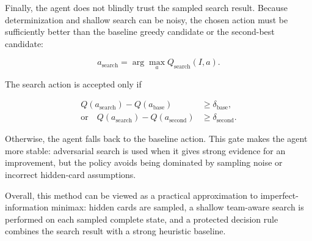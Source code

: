 Finally, the agent does not blindly trust the sampled search result. Because
determinization and shallow search can be noisy, the chosen action must be
sufficiently better than the baseline greedy candidate or the second-best
candidate:

\[
    a_{\mathrm{search}} = \arg\max_a Q_{\mathrm{search}}(I,a).
\]

The search action is accepted only if

\begin{align*}
    Q(a_{\mathrm{search}}) - Q(a_{\mathrm{base}})
     & \ge \delta_{\mathrm{base}},   \\
    \text{or}\quad
    Q(a_{\mathrm{search}}) - Q(a_{\mathrm{second}})
     & \ge \delta_{\mathrm{second}}.
\end{align*}

Otherwise, the agent falls back to the baseline action. This gate makes the
agent more stable: adversarial search is used when it gives strong evidence for
an improvement, but the policy avoids being dominated by sampling noise or
incorrect hidden-card assumptions.

Overall, this method can be viewed as a practical approximation to
imperfect-information minimax: hidden cards are sampled, a shallow team-aware
search is performed on each sampled complete state, and a protected decision
rule combines the search result with a strong heuristic baseline.
